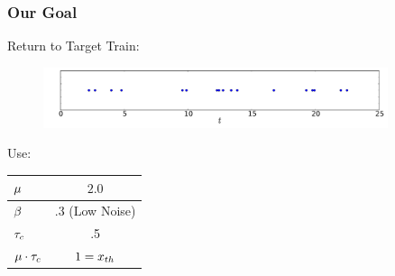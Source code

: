 \documentclass{beamer}
\begin{document}
\begin{frame}
\frametitle{Our Goal}
Return to 
Target Train:

\begin{figure}
\includegraphics[width=0.9\textwidth]
{Figs/TrainController/target_train_Ahmadian.pdf}
\end{figure}

\vskip 3pt

Use:
\begin{table}
\begin{tabular}{|l|c|}
\hline
${\mu }$  & $2.0$ \\
\hline
${\beta} $ & .3 (Low Noise)\\ 
\hline
${ \tau_{c} }$ & .5 \\
\hline
${\mu } \cdot { \tau_{c} } $ & $1 = { x_{th} }$ \\
\hline
\end{tabular}
\end{table}


\end{frame}
\end{document}
